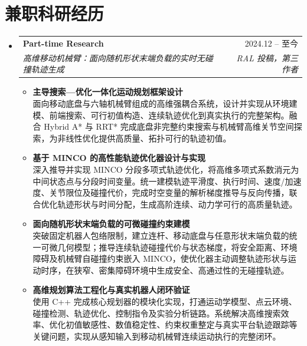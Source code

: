 \documentclass[letterpaper,11pt]{article}
\makeatletter
\newcommand{\resumeItem}[1]{
  \item\small{
    {#1 \vspace{-2pt}}
  }
}
\newcommand{\resumeSubheading}[4]{
  \vspace{-2pt}\item
    \begin{tabular*}{0.97\textwidth}[t]{l@{\extracolsep{\fill}}r}
      \textbf{#1} & #2 \\
      \textit{\small#3} & \textit{\small #4} \\
    \end{tabular*}\vspace{-7pt}
}
\newcommand{\resumeSubHeadingListStart}{\begin{itemize}[leftmargin=0.15in, label={}]}
\newcommand{\resumeSubHeadingListEnd}{\end{itemize}}
\newcommand{\resumeItemListStart}{\begin{itemize}}
\newcommand{\resumeItemListEnd}{\end{itemize}\vspace{-5pt}}
\makeatother
\begin{document}
\section{兼职科研经历}
\enlargethispage{0.30in}
  \resumeSubHeadingListStart
    \resumeSubheading
      {Part-time Research}{2024.12 -- 至今}
      {高维移动机械臂：面向随机形状末端负载的实时无碰撞轨迹生成}{RAL 投稿，第三作者}
      \resumeItemListStart
        \resumeItem{\normalsize{\textbf{主导搜索—优化一体化运动规划框架设计}} \\
        \small{面向移动底盘与六轴机械臂组成的高维强耦合系统，设计并实现从环境建模、前端搜索、可行初值构造、连续轨迹优化到真实执行的完整架构。融合 Hybrid A* 与 RRT* 完成底盘非完整约束搜索与机械臂高维关节空间探索，为非线性优化提供高质量、拓扑可行的轨迹初值。}}
        \resumeItem{\normalsize{\textbf{基于 MINCO 的高性能轨迹优化器设计与实现}} \\
        \small{深入推导并实现 MINCO 分段多项式轨迹优化，将高维多项式系数消元为中间状态点与分段时间变量。统一建模轨迹平滑度、执行时间、速度/加速度、关节限位及碰撞代价，完成时空变量的解析梯度推导与反向传播，联合优化轨迹形状与时间分配，生成高阶连续、动力学可行的高质量轨迹。}}
        \resumeItem{\normalsize{\textbf{面向随机形状末端负载的可微碰撞约束建模}} \\
        \small{突破固定机器人包络限制，建立连杆、移动底盘与任意形状末端负载的统一可微几何模型；推导连续轨迹碰撞代价与状态梯度，将安全距离、环境障碍及机械臂自碰撞约束嵌入 MINCO，使优化器主动调整轨迹形状与运动时序，在狭窄、密集障碍环境中生成安全、高通过性的无碰撞轨迹。}}
        \resumeItem{\normalsize{\textbf{高维规划算法工程化与真实机器人闭环验证}} \\
        \small{使用 C++ 完成核心规划器的模块化实现，打通运动学模型、点云环境、碰撞检测、轨迹优化、控制指令及实验分析链路。系统解决高维搜索效率、优化初值敏感性、数值稳定性、约束权重整定与真实平台轨迹跟踪等关键问题，实现从感知输入到移动机械臂连续运动执行的完整闭环。}}
      \resumeItemListEnd
  \resumeSubHeadingListEnd

\end{document}
